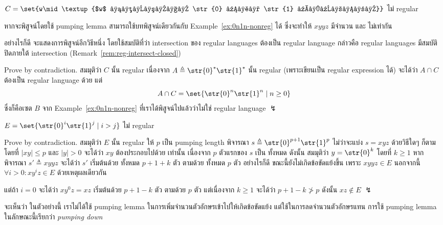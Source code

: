 \begin{example}
$C=\set{w\mid\textup{$w$ มีจำนวน \str{0} และ \str{1} เท่ากัน}}$ ไม่ regular

หากจะพิสูจน์โดยใช้ pumping lemma สามารถใช้บทพิสูจน์เดียวกันกับ Example~\ref{ex:0n1n-nonreg} ได้ ซึ่งจะทำให้ $xyyz$ มีจำนวน  และ  ไม่เท่ากัน

อย่างไรก็ดี จะแสดงการพิสูจน์อีกวิธีหนึ่ง โดยใช้สมบัติที่ว่า intersection ของ regular languages ต้องเป็น regular language กล่าวคือ regular languages มีสมบัติปิดภายใต้ intersection (Remark~\ref{rem:reg-intersect-closed})

Prove by contradiction.  สมมุติว่า $C$ นั้น regular \enskip เนื่องจาก $A\triangleq\str{0}^*\str{1}^*$ นั้น regular (เพราะเขียนเป็น regular expression ได้) จะได้ว่า $A\cap C$ ต้องเป็น regular language ด้วย \enskip แต่ \[A\cap C=\set{\str{0}^n\str{1}^n\mid n\geq 0}\] ซึ่งก็คือเซต $B$ จาก Example~\ref{ex:0n1n-nonreg} ที่เราได้พิสูจน์ไปแล้วว่าไม่ใช่ regular language $\lightning$
\end{example}

\begin{example}
$E=\set{\str{0}^i\str{1}^j\mid i>j}$ ไม่ regular

Prove by contradiction.  สมมุติว่า $E$ นั้น regular \enskip ให้ $p$ เป็น pumping length \enskip พิจารณา $s\triangleq\str{0}^{p+1}\str{1}^p$ \enskip ไม่ว่าจะแบ่ง $s=xyz$ ด้วยวิธีใดๆ ก็ตาม โดยที่ $|xy|\leq p$ และ $|y|>0$ จะได้ว่า $xy$ ต้องประกอบไปด้วย  เท่านั้น เนื่องจาก $p$ ตัวแรกของ $s$ เป็น  ทั้งหมด \enskip ดังนั้น สมมุติว่า $y=\str{0}^k$ โดยที่ $k\geq 1$ \enskip หากพิจารณา $s'\triangleq xyyz$ จะได้ว่า $s'$ เริ่มต้นด้วย  ทั้งหมด $p+1+k$ ตัว ตามด้วย  ทั้งหมด $p$ ตัว \enskip อย่างไรก็ดี ขณะนี้ยังไม่เกิดข้อขัดแย้งขึ้น เพราะ $xyyz\in E$ \enskip นอกจากนี้ $\forall i>0: xy^iz\in E$ ด้วยเหตุผลเดียวกัน

แต่ถ้า $i=0$ จะได้ว่า $xy^0z=xz$ เริ่มต้นด้วย  $p+1-k$ ตัว ตามด้วย  $p$ ตัว \enskip แต่เนื่องจาก $k\geq 1$ จะได้ว่า $p+1-k\not>p$ \enskip ดังนั้น $xz\notin E$ $\lightning$

จะเห็นว่า ในตัวอย่างนี้ เราไม่ได้ใช้ pumping lemma ในการเพิ่มจำนวนตัวอักษรเข้าไปให้เกิดข้อขัดแย้ง แต่ใช้ในการลดจำนวนตัวอักษรแทน \enskip การใช้ pumping lemma ในลักษณะนี้เรียกว่า \emph{pumping down}
\end{example}

